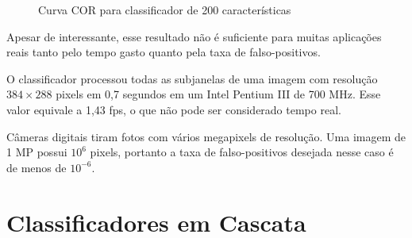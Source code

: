 \begin{figure}[htbp]
   \caption{Curva COR para classificador de 200 características}
   \label{fig:roc_200_features}
   \begin{center}
   \end{center}
\end{figure}
%
Apesar de interessante, esse resultado não é suficiente para muitas aplicações reais tanto pelo tempo gasto quanto pela taxa de falso-positivos.

O classificador processou todas as subjanelas de uma imagem com resolução $384\times288$ pixels em 0,7 segundos em um Intel Pentium III de 700 MHz. Esse valor equivale a 1,43 fps, o que não pode ser considerado tempo real.

Câmeras digitais tiram fotos com vários megapixels de resolução. 
Uma imagem de 1 MP possui $10^6$ pixels, portanto a taxa de falso-positivos desejada nesse caso é de menos de $10^{-6}$.

\section{Classificadores em Cascata}\label{sec:cascade}

